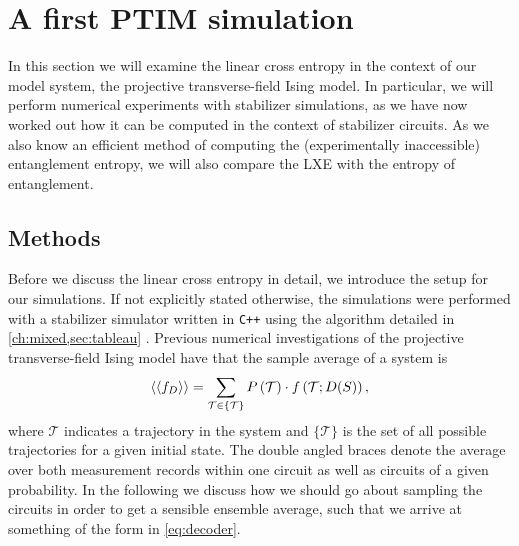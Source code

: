 \section{A first PTIM simulation}

In this section we will examine the linear cross entropy in the context of our
model system, the projective transverse-field Ising model. In particular, we
will perform numerical experiments with stabilizer simulations, as we have now
worked out how it can be computed in the context of stabilizer circuits. As we
also know an efficient method of computing the (experimentally inaccessible)
entanglement entropy, we will also compare the LXE with the entropy of
entanglement.
\subsection{Methods}\label{sec:lxe-numeric}
Before we discuss the linear cross entropy in detail, we introduce the setup
for our simulations. If not explicitly stated otherwise, the simulations were
performed with a stabilizer simulator written in \verb|C++| using the algorithm detailed in
\cref{ch:mixed,sec:tableau} \cite{langCliffordCircuitSimulator2022}.
Previous numerical investigations of the projective transverse-field Ising
model have that the sample average of a system is
\cite{roserDecodingProjectiveTransverse2023}
\begin{align}\label{eq:decoder}
      \expval{\expval{f_D}} = \sum_{\mathcal{T} \in \{
    \mathcal{T} \} } P\left(\mathcal{T}\right) \cdot
    f\left(\mathcal{T} ; D(S)\right)
,\end{align}
where $\mathcal{T}$ indicates a trajectory in the system and
$\{ \mathcal{T} \}$ is the set of all possible trajectories for a given
initial state. The double angled braces 
denote the average over both measurement records within one circuit as well as
circuits of a given probability. In the following we discuss how we should go
about sampling the circuits in order to get a sensible ensemble average, such
that we arrive at something of the form in \cref{eq:decoder}.

